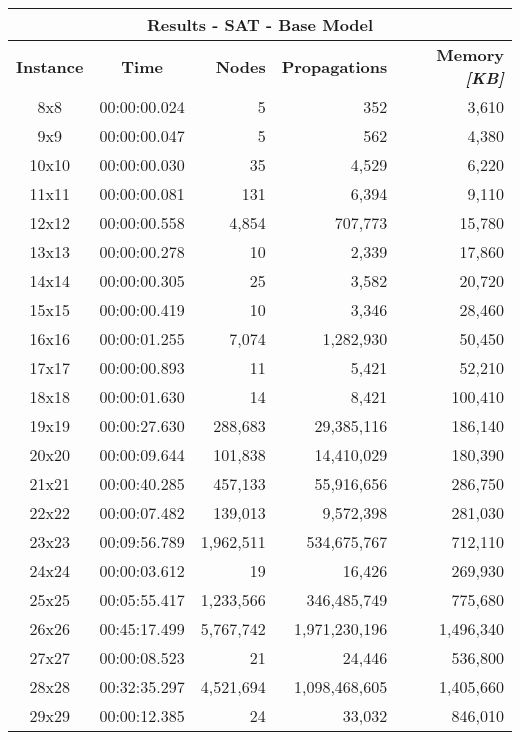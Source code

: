 
\begin{center}
    \begin{tabular}{|c|c|r|r|r|}
        \hline
        \multicolumn{5}{|c|}{\textbf{Results - SAT - Base Model}} \\
        \hline
        \textbf{Instance} & \textbf{Time} & \textbf{Nodes} & \textbf{Propagations} & \textbf{Memory \textit{[KB]}} \\
        
        \hline
		8x8 & 00:00:00.024 & 5 & 352 & 3,610 \\ \hline
		9x9 & 00:00:00.047 & 5 & 562 & 4,380 \\ \hline
		10x10 & 00:00:00.030 & 35 & 4,529 & 6,220 \\ \hline
		11x11 & 00:00:00.081 & 131 & 6,394 & 9,110 \\ \hline
		12x12 & 00:00:00.558 & 4,854 & 707,773 & 15,780 \\ \hline
		13x13 & 00:00:00.278 & 10 & 2,339 & 17,860 \\ \hline
		14x14 & 00:00:00.305 & 25 & 3,582 & 20,720 \\ \hline
		15x15 & 00:00:00.419 & 10 & 3,346 & 28,460 \\ \hline
		16x16 & 00:00:01.255 & 7,074 & 1,282,930 & 50,450 \\ \hline
		17x17 & 00:00:00.893 & 11 & 5,421 & 52,210 \\ \hline
		18x18 & 00:00:01.630 & 14 & 8,421 & 100,410 \\ \hline
		19x19 & 00:00:27.630 & 288,683 & 29,385,116 & 186,140 \\ \hline
		20x20 & 00:00:09.644 & 101,838 & 14,410,029 & 180,390 \\ \hline
		21x21 & 00:00:40.285 & 457,133 & 55,916,656 & 286,750 \\ \hline
		22x22 & 00:00:07.482 & 139,013 & 9,572,398 & 281,030 \\ \hline
		23x23 & 00:09:56.789 & 1,962,511 & 534,675,767 & 712,110 \\ \hline
		24x24 & 00:00:03.612 & 19 & 16,426 & 269,930 \\ \hline
		25x25 & 00:05:55.417 & 1,233,566 & 346,485,749 & 775,680 \\ \hline
		26x26 & 00:45:17.499 & 5,767,742 & 1,971,230,196 & 1,496,340 \\ \hline
		27x27 & 00:00:08.523 & 21 & 24,446 & 536,800 \\ \hline
		28x28 & 00:32:35.297 & 4,521,694 & 1,098,468,605 & 1,405,660 \\ \hline
		29x29 & 00:00:12.385 & 24 & 33,032 & 846,010 \\ \hline

\end{tabular}
\end{center}
